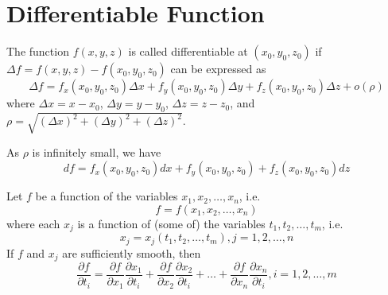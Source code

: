 \section{Differentiable Function}
\begin{mydef}
\normalfont The function \(f(x, y, z)\) is called differentiable at \((x_0, y_0, z_0)\) if \(\Delta f = f(x, y, z) - f(x_0, y_0, z_0)\) can be expressed as
%
\[\Delta f = f_x(x_0,y_0,z_0)\Delta x + f_y(x_0,y_0,z_0)\Delta y + f_z(x_0,y_0,z_0)\Delta z + o(\rho)\]
%
where \(\Delta x = x - x_0\), \(\Delta y = y - y_0\), \(\Delta z = z - z_0\), and \(\rho = \sqrt{(\Delta x)^2 + (\Delta y)^2 + (\Delta z)^2}\).

As \(\rho\) is infinitely small, we have
\[df = f_x(x_0,y_0,z_0)dx + f_y(x_0,y_0,z_0) + f_z(x_0,y_0,z_0)dz\]
\end{mydef}

\begin{mydef}
\normalfont Let \(f\) be a function of the variables \(x_1, x_2, \hdots, x_n\), i.e. 
%
\[f = f(x_1, x_2, \hdots, x_n)\]
%
where each \(x_j\) is a function of (some of) the variables \(t_1, t_2, \hdots, t_m\), i.e. 
%
\[x_j = x_j(t_1, t_2, \hdots, t_m), j = 1, 2, \hdots, n\]
%
If \(f\) and \(x_j\) are sufficiently smooth, then
%
\[\frac{\partial f}{\partial t_i} = \frac{\partial f}{\partial x_1}\frac{\partial x_1}{\partial t_i} + \frac{\partial f}{\partial x_2}\frac{\partial x_2}{\partial t_i} + \hdots + \frac{\partial f}{\partial x_n}\frac{\partial x_n}{\partial t_i}, i = 1,2,\hdots, m\]
%
\end{mydef}



























